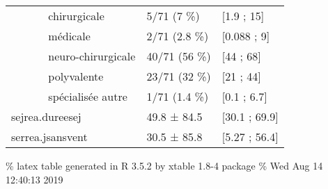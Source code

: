 \documentclass[]{article}
\begin{document}
\begin{longtable}{lll}
  ~~~~~~ chirurgicale & 5/71 (7 \%) &  [1.9 ; 15] \\ 
  ~~~~~~ médicale & 2/71 (2.8 \%) &  [0.088 ; 9] \\ 
  ~~~~~~ neuro-chirurgicale & 40/71 (56 \%) &  [44 ; 68] \\ 
  ~~~~~~ polyvalente & 23/71 (32 \%) &  [21 ; 44] \\ 
  ~~~~~~ spécialisée autre & 1/71 (1.4 \%) &  [0.1 ; 6.7] \\ 
  sejrea.dureesej & 49.8 ± 84.5 & [30.1 ; 69.9] \\ 
  serrea.jsansvent & 30.5 ± 85.8 & [5.27 ; 56.4] \\ 
  \end{longtable}

\% latex table generated in R 3.5.2 by xtable 1.8-4 package \% Wed Aug
14 12:40:13 2019
\end{document}
